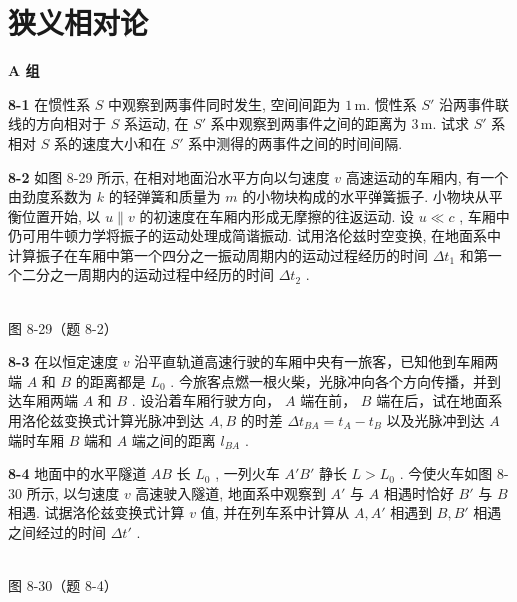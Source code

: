 \chapter{狭义相对论}
\begin{center}\textbf{A 组}\end{center}

\textbf{8-1} 在惯性系 $S$ 中观察到两事件同时发生, 空间间距为  $1\,\mathrm m$. 惯性系 $S'$ 沿两事件联线的方向相对于 $S$ 系运动, 在 $S'$ 系中观察到两事件之间的距离为  $3\,\mathrm m$. 试求 $S'$ 系相对 $S$ 系的速度大小和在 $S'$ 系中测得的两事件之间的时间间隔.

\newpage

\textbf{8-2} 如图 8-29 所示, 在相对地面沿水平方向以匀速度 $v$ 高速运动的车厢内, 有一个由劲度系数为 $k$ 的轻弹簧和质量为 $m$ 的小物块构成的水平弹簧振子. 小物块从平衡位置开始, 以 $u \parallel v$ 的初速度在车厢内形成无摩擦的往返运动. 设 $u \ll c$ , 车厢中仍可用牛顿力学将振子的运动处理成简谐振动. 试用洛伦兹时空变换, 在地面系中计算振子在车厢中第一个四分之一振动周期内的运动过程经历的时间 $\Delta t_{1}$ 和第一个二分之一周期内的运动过程中经历的时间 $\Delta t_{2}$ .

\begin{center}
\resizebox{0.50\textwidth}{!}{}\\[4pt]
{\small 图 8-29（题 8-2）}
\end{center}

\newpage

\textbf{8-3} 在以恒定速度 $v$ 沿平直轨道高速行驶的车厢中央有一旅客，已知他到车厢两端 $A$ 和 $B$ 的距离都是 $L_{0}$ . 今旅客点燃一根火柴，光脉冲向各个方向传播，并到达车厢两端 $A$ 和 $B$ . 设沿着车厢行驶方向， $A$ 端在前， $B$ 端在后，试在地面系用洛伦兹变换式计算光脉冲到达 $A, B$ 的时差 $\Delta t_{BA} = t_A - t_B$ 以及光脉冲到达 $A$ 端时车厢 $B$ 端和 $A$ 端之间的距离 $l_{BA}$ .

\newpage

\textbf{8-4} 地面中的水平隧道 $AB$ 长 $L_0$ , 一列火车 $A'B'$ 静长 $L > L_0$ . 今使火车如图 8-30 所示, 以匀速度 $v$ 高速驶入隧道, 地面系中观察到 $A'$ 与 $A$ 相遇时恰好 $B'$ 与 $B$ 相遇. 试据洛伦兹变换式计算 $v$ 值, 并在列车系中计算从 $A, A'$ 相遇到 $B, B'$ 相遇之间经过的时间 $\Delta t'$ .

\begin{center}
\resizebox{0.50\textwidth}{!}{}\\[4pt]
{\small 图 8-30（题 8-4）}
\end{center}

